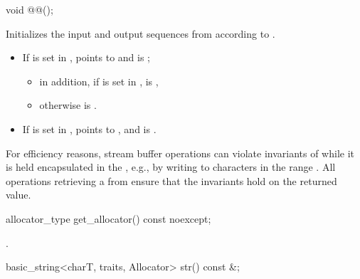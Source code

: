\begin{itemdecl}
void @@();
\end{itemdecl}

\begin{itemdescr}
\pnum
\effects
Initializes the input and output sequences from 
according to .

\pnum
\ensures
\begin{itemize}
\item If  is set in ,
   points to  and
   is ;
  \begin{itemize}
  \item in addition, if  is set in ,
     is ,
  \item otherwise  is .
  \end{itemize}
\item If  is set in ,
   points to , and
  is .
\end{itemize}

\pnum
\begin{note}
For efficiency reasons,
stream buffer operations can violate invariants of 
while it is held encapsulated in the ,
e.g., by writing to characters in the range
.
All operations retrieving a  from 
ensure that the  invariants hold on the returned value.
\end{note}
\end{itemdescr}

%
\begin{itemdecl}
allocator_type get_allocator() const noexcept;
\end{itemdecl}

\begin{itemdescr}
\pnum
\returns
{}.
\end{itemdescr}

%
\begin{itemdecl}
basic_string<charT, traits, Allocator> str() const &;
\end{itemdecl}

